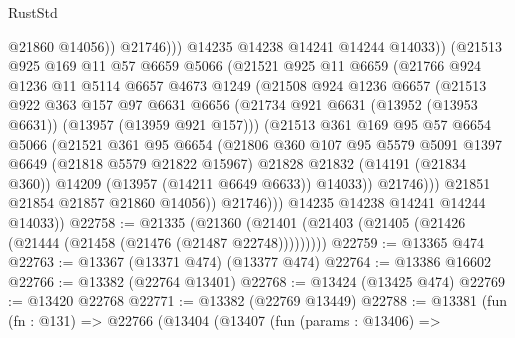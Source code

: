 \begin{lexlean}{RustStd}
\begin{coremodule}
                          @21860
                          @14056))
                      @21746)))
                @14235
                @14238
                @14241
                @14244
                @14033))
            (@21513
              @925
              @169
              @11
              @57
              @6659
              @5066
              (@21521
                @925
                @11
                @6659
                (@21766
                  @924
                  @1236
                  @11
                  @5114
                  @6657
                  @4673
                  @1249
                  (@21508
                    @924
                    @1236
                    @6657
                    (@21513
                      @922
                      @363
                      @157
                      @97
                      @6631
                      @6656
                      (@21734 @921 @6631 (@13952 (@13953 @6631)) (@13957 (@13959 @921 @157)))
                      (@21513
                        @361
                        @169
                        @95
                        @57
                        @6654
                        @5066
                        (@21521
                          @361
                          @95
                          @6654
                          (@21806
                            @360
                            @107
                            @95
                            @5579
                            @5091
                            @1397
                            @6649
                            (@21818 @5579 @21822 @15967)
                            @21828
                            @21832
                            (@14191 (@21834 @360))
                            @14209
                            (@13957 (@14211 @6649 @6633))
                            @14033))
                        @21746)))
                  @21851
                  @21854
                  @21857
                  @21860
                  @14056))
              @21746)))
        @14235
        @14238
        @14241
        @14244
        @14033))
@22758 := @21335
    (@21360 (@21401 (@21403 (@21405 (@21426 (@21444 (@21458 (@21476 (@21487 @22748)))))))))
@22759 := @13365 @474
@22763 := @13367 (@13371 @474) (@13377 @474)
@22764 := @13386 @16602
@22766 := @13382 (@22764 @13401)
@22768 := @13424 (@13425 @474)
@22769 := @13420 @22768
@22771 := @13382 (@22769 @13449)
@22788 := @13381
    (fun (fn : @131) =>
    @22766
      (@13404
        (@13407
          (fun (params : @13406) =>

\end{coremodule}
\end{lexlean}
